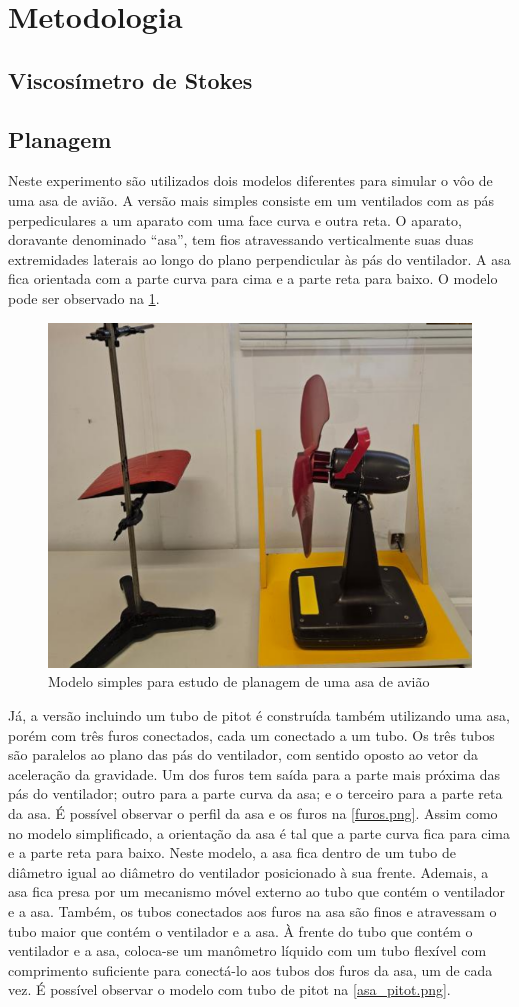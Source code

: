 \section{Metodologia}

\subsection{Viscosímetro de Stokes}

\subsection{Planagem}
    Neste experimento são utilizados dois modelos diferentes para simular o vôo de uma asa de avião. A versão mais simples consiste em um ventilados com as pás perpediculares a um aparato com uma face curva e outra reta. O aparato, doravante denominado ``asa'', tem fios atravessando verticalmente suas duas extremidades laterais ao longo do plano perpendicular às pás do ventilador. A asa fica orientada com a parte curva para cima e a parte reta para baixo. O modelo pode ser observado na \cref{asa_simples.png}.

    \begin{figure}[H]
        \centering
        \includegraphics[width=0.35\linewidth]{fig/asa_simples.png}
        \caption{Modelo simples para estudo de planagem de uma asa de avião}
        \label{asa_simples.png}
    \end{figure}
    
    Já, a versão incluindo um tubo de pitot é construída também utilizando uma asa, porém com três furos conectados, cada um conectado a um tubo. Os três tubos são paralelos ao plano das pás do ventilador, com sentido oposto ao vetor da aceleração da gravidade. Um dos furos tem saída para a parte mais próxima das pás do ventilador; outro para a parte curva da asa; e o terceiro para a parte reta da asa. É possível observar o perfil da asa e os furos na \cref{furos.png}. Assim como no modelo simplificado, a orientação da asa é tal que a parte curva fica para cima e a parte reta para baixo. Neste modelo, a asa fica dentro de um tubo de diâmetro igual ao diâmetro do ventilador posicionado à sua frente. Ademais, a asa fica presa por um mecanismo móvel externo ao tubo que contém o ventilador e a asa. Também, os tubos conectados aos furos na asa são finos e atravessam o tubo maior que contém o ventilador e a asa. À frente do tubo que contém o ventilador e a asa, coloca-se um manômetro líquido com um tubo flexível com comprimento suficiente para conectá-lo aos tubos dos furos da asa, um de cada vez. É possível observar o modelo com tubo de pitot na \cref{asa_pitot.png}.

